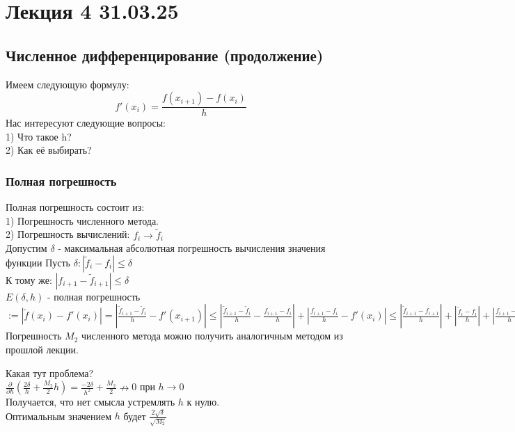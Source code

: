 \section{Лекция 4 31.03.25}

\subsection{Численное дифференцирование (продолжение)}

Имеем следующую формулу:
\begin{equation}
 f'(x_i) = \frac{f(x_{i+1}) - f(x_{i})}{h}
\end{equation}
Нас интересуют следующие вопросы:\\
1) Что такое h?\\
2) Как её выбирать?

\subsubsection{Полная погрешность}
Полная погрешность состоит из:\\
1) Погрешность численного метода.\\
2) Погрешность вычислений: $f_{i}\to \tilde{f}_i $ \\

Допустим $\delta$ - максимальная абсолютная погрешность вычисления значения функции
Пусть $\delta: |\tilde{f}_i-f_i| \leq \delta $ \\
К тому же: $|f_{i+1}-\tilde{f}_{i+1}| \leq \delta $ \\

$E(\delta,h)$ - полная погрешность $:= |\tilde{f}(x_{i})-f'(x_{i})|=|\frac{\tilde{f}_{i+1} - \tilde{f}_{i}}{h} -f'(x_{i+1})| \leq |\frac{\tilde{f}_{i+1} - \tilde{f}_{i}}{h} - \frac{f_{i+1} - f_{i}}{h}| + |\frac{f_{i+1} - f_{i}}{h} -f'(x_{i})|  \leq  |\frac{\tilde{f}_{i+1} - f_{i+1}}{h}| + |\frac{\tilde{f}_{i} - f_{i}}{h}| + |\frac{f_{i+1} - f_{i}}{h} -f'(x_{i})|  \leq \frac{2\delta}{h} + \frac{M_2}{2}h $ \\
Погрешность $M_2$ численного метода можно получить аналогичным методом из прошлой лекции.


Какая тут проблема?\\
$\frac{\partial}{\partial h}(\frac{2\delta}{h} + \frac{M_2}{2}h) = \frac{-2\delta}{h^2} + \frac{M_2}{2}  \nrightarrow 0$ при $h \to 0$\\
Получается, что нет смысла устремлять $h$ к нулю.\\
Оптимальным значением $h$ будет $\frac{2\sqrt{\delta}}{\sqrt{M_2}}$\\



